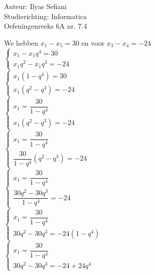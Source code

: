 \documentclass[a4paper]{article}
\begin{document}
\noindent \large Auteur: Ilyas Sefiani \\
\noindent \large Studierichting: Informatica\\
\noindent \large Oefeningenreeks 6A nr. 7.4\\

\medskip

\normalsize
We hebben $x_{1}-x_{5}=30$ en voor $x_{3}-x_{4}=-24$\\

$\left \{
\begin{array}{l}
x_{1}-x_{1}q^4=30 \\
x_{1}q^2-x_{1}q^3=-24
\end{array}
\right .$\\

$\left \{
\begin{array}{l}
x_{1}(1-q^4)=30 \\
x_{1}(q^2-q^3)=-24
\end{array}
\right .$\\

$\left \{
\begin{array}{l}
x_{1}=\dfrac{30}{1-q^4} \\
x_{1}(q^2-q^3)=-24
\end{array}
\right .$\\

$\left \{
\begin{array}{l}
x_{1}=\dfrac{30}{1-q^4} \\
\dfrac{30}{1-q^4}(q^2-q^3)=-24
\end{array}
\right .$\\

$\left \{
\begin{array}{l}
x_{1}=\dfrac{30}{1-q^4} \\
\dfrac{30q^2-30q^3}{1-q^4}=-24
\end{array}
\right .$\\


$\left \{
\begin{array}{l}
x_{1}=\dfrac{30}{1-q^4} \\
30q^2-30q^3=-24(1-q^4)
\end{array}
\right .$\\

$\left \{
\begin{array}{l}
x_{1}=\dfrac{30}{1-q^4} \\
30q^2-30q^3=-24+24q^4
\end{array}
\right .$\\
\end{document}

